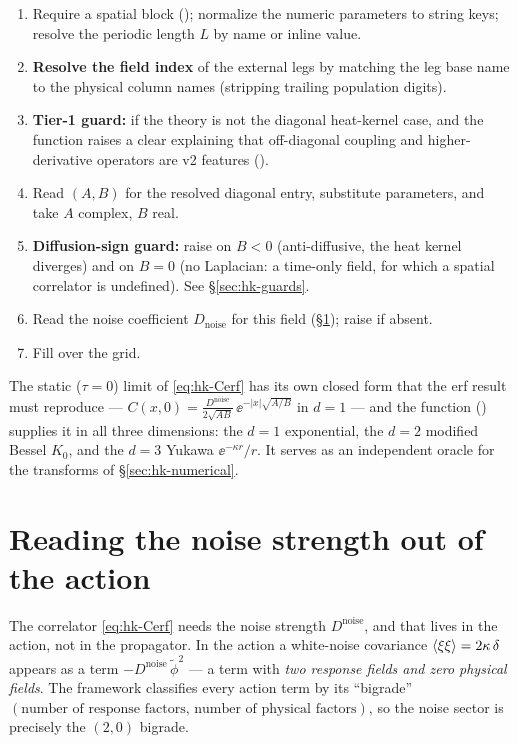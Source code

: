 \begin{enumerate}
  \item Require a spatial block (); normalize the
        numeric parameters to string keys; resolve the periodic length $L$ by
        name or inline value.
  \item \textbf{Resolve the field index} of the external legs by matching the
        leg base name to the physical column names (stripping trailing
        population digits).
  \item \textbf{Tier-1 guard:} if  the theory
        is not the diagonal heat-kernel case, and the function raises a clear
         explaining that off-diagonal coupling and
        higher-derivative operators are v2 features
        ().
  \item Read $(A,B)$ for the resolved diagonal entry, substitute parameters, and
        take $A$ complex, $B$ real.
  \item \textbf{Diffusion-sign guard:} raise on $B<0$ (anti-diffusive, the heat
        kernel diverges) and on $B=0$ (no Laplacian: a time-only field, for
        which a spatial correlator is undefined). See \S\ref{sec:hk-guards}.
  \item Read the noise coefficient $D_{\text{noise}}$ for this field
        (\S\ref{sec:hk-noise}); raise if absent.
  \item Fill  over the
        grid.
\end{enumerate}

The static ($\tau=0$) limit of \eqref{eq:hk-Cerf} has its own closed form that
the erf result must reproduce --- $C(x,0)=\frac{D^{\text{noise}}}{2\sqrt{AB}}\,
\ee^{-|x|\sqrt{A/B}}$ in $d=1$ --- and the function
 ()
supplies it in all three dimensions: the $d=1$ exponential, the $d=2$ modified
Bessel $K_0$, and the $d=3$ Yukawa $\ee^{-\kappa r}/r$. It serves as an
independent oracle for the transforms of \S\ref{sec:hk-numerical}.

\section{Reading the noise strength out of the action}\label{sec:hk-noise}

The correlator \eqref{eq:hk-Cerf} needs the noise strength $D^{\text{noise}}$,
and that lives in the action, not in the propagator. In the \msrjd{} action a
white-noise covariance $\left\langle \xi\xi \right\rangle=2\kappa\,\delta$ appears as a term
$-D^{\text{noise}}\,\tilde\phi^{2}$ --- a term with \emph{two response fields and
zero physical fields}. The framework classifies every action term by its
``bigrade'' $(\text{number of response factors},\,\text{number of physical
factors})$, so the noise sector is precisely the $(2,0)$ bigrade.

